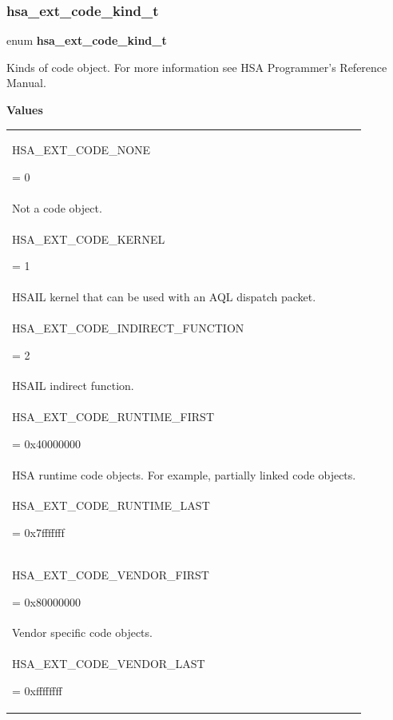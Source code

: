 \documentclass[final]{book}
\newcommand{\reftyp}[1]{#1}
\newcommand{\refenu}[1]{\reftyp{#1}}
\newenvironment{mylongtable}{\rowcolors{0}{lightgray}{lightgray}\longtable} {
\endlongtable}
\begin{document}
\subsubsection{hsa_\-ext_\-code_\-kind_\-t}
\vspace{-5.5mm}\begin{mylongtable}{@{}p{\textwidth}}
\rule{0pt}{3ex}\rule[-2.5ex]{0pt}{0pt}enum \hypertarget{group__finalizer_1ga3a26aac857ef4f02699a2ed8a4c425e3}{\textbf{hsa_\-ext_\-code_\-kind_\-t}}
\end{mylongtable}
\vspace{-2mm}Kinds of code object. For more information see HSA Programmer's Reference Manual.

\noindent\textbf{Values}\\[-5mm]
\begin{longtable}{@{\hspace{2em}}p{\linewidth-2em}}
\hspace{-2em}\hypertarget{group__finalizer_1gga3a26aac857ef4f02699a2ed8a4c425e3aa692c691cdb10a56486a1e8d246414e3}{\refenu{HSA_\-EXT_\-CODE_\-NONE}} = 0\\Not a code object.\\[2mm]
\hspace{-2em}\hypertarget{group__finalizer_1gga3a26aac857ef4f02699a2ed8a4c425e3a5c83ef1db7eaa20cdf2612ba26e316cc}{\refenu{HSA_\-EXT_\-CODE_\-KERNEL}} = 1\\HSAIL kernel that can be used with an AQL dispatch packet.\\[2mm]
\hspace{-2em}\hypertarget{group__finalizer_1gga3a26aac857ef4f02699a2ed8a4c425e3a5f810d8ab0aae6b7f5af079857bbb14c}{\refenu{HSA_\-EXT_\-CODE_\-INDIRECT_\-FUNCTION}} = 2\\HSAIL indirect function.\\[2mm]
\hspace{-2em}\hypertarget{group__finalizer_1gga3a26aac857ef4f02699a2ed8a4c425e3afe329fae97936c684cd1e7df360c7160}{\refenu{HSA_\-EXT_\-CODE_\-RUNTIME_\-FIRST}} = 0x40000000\\HSA runtime code objects. For example, partially linked code objects.\\[2mm]
\hspace{-2em}\hypertarget{group__finalizer_1gga3a26aac857ef4f02699a2ed8a4c425e3a9c49857996a8d326eabb3080b9e38972}{\refenu{HSA_\-EXT_\-CODE_\-RUNTIME_\-LAST}} = 0x7fffffff\\[2mm]
\hspace{-2em}\hypertarget{group__finalizer_1gga3a26aac857ef4f02699a2ed8a4c425e3aefd6d814296d049b06ab2de301cd10b1}{\refenu{HSA_\-EXT_\-CODE_\-VENDOR_\-FIRST}} = 0x80000000\\Vendor specific code objects.\\[2mm]
\hspace{-2em}\hypertarget{group__finalizer_1gga3a26aac857ef4f02699a2ed8a4c425e3accaced1295912da1748d70c5abde593b}{\refenu{HSA_\-EXT_\-CODE_\-VENDOR_\-LAST}} = 0xffffffff
\end{longtable}
\end{document}
